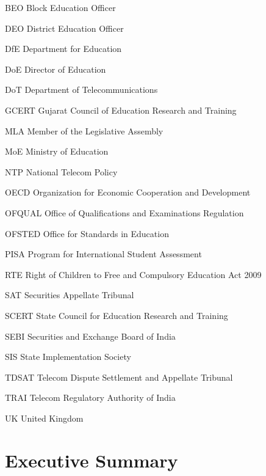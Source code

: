 \documentclass[a4paper, 12pt, twoside]{article}
\begin{document}
\begin{abbrv}
         
        \item[BEO]			Block Education Officer
        \item[DEO]				District Education Officer
        \item[DfE]			Department for Education
        \item[DoE]				Director of Education
        \item[DoT]			Department of Telecommunications
        \item[GCERT]				Gujarat Council of Education Research and Training 
        \item[MLA]				Member of the Legislative Assembly
        \item[MoE]				Ministry of Education 
        \item[NTP]				National Telecom Policy
        \item[OECD]			Organization for Economic Cooperation and Development
        \item[OFQUAL]			Office of Qualifications and Examinations Regulation
        \item[OFSTED]			Office for Standards in Education
                \item[PISA]			Program for International Student Assessment
        \item[RTE]				Right of Children to Free and Compulsory Education Act 2009 
        \item[SAT]				Securities Appellate Tribunal
        \item[SCERT]			State Council for Education Research and Training
        \item[SEBI]				Securities and Exchange Board of India
        \item[SIS]				State Implementation Society
        \item[TDSAT]			Telecom Dispute Settlement and Appellate Tribunal
        \item[TRAI]			Telecom Regulatory Authority of India
        \item[UK]		United Kingdom
              
        
         
\end{abbrv}
\newpage        

                    
\newpage
\section*{Executive Summary}
                    
\end{document}
